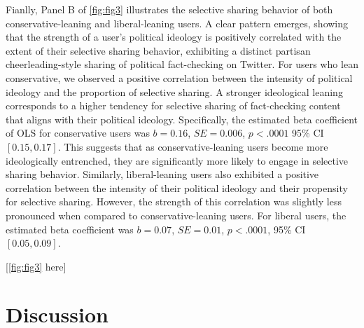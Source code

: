 \documentclass[
  12pt,
]{article}
\begin{document}
Fianlly, Panel B of \autoref{fig:fig3} illustrates the selective sharing
behavior of both conservative-leaning and liberal-leaning users. A clear
pattern emerges, showing that the strength of a user's political
ideology is positively correlated with the extent of their selective
sharing behavior, exhibiting a distinct partisan cheerleading-style
sharing of political fact-checking on Twitter. For users who lean
conservative, we observed a positive correlation between the intensity
of political ideology and the proportion of selective sharing. A
stronger ideological leaning corresponds to a higher tendency for
selective sharing of fact-checking content that aligns with their
political ideology. Specifically, the estimated beta coefficient of OLS
for conservative users was \(b = 0.16\), \(SE = 0.006\), \(p < .0001\)
95\% CI \([0.15, 0.17]\). This suggests that as conservative-leaning
users become more ideologically entrenched, they are significantly more
likely to engage in selective sharing behavior. Similarly,
liberal-leaning users also exhibited a positive correlation between the
intensity of their political ideology and their propensity for selective
sharing. However, the strength of this correlation was slightly less
pronounced when compared to conservative-leaning users. For liberal
users, the estimated beta coefficient was \(b = 0.07\), \(SE = 0.01\),
\(p < .0001\), 95\% CI \([0.05, 0.09]\).

\begin{center}
[\autoref{fig:fig3} here]
\end{center}

\hypertarget{discussion}{%
\section{Discussion}\label{discussion}}
\end{document}
